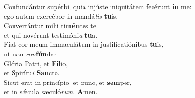 \evenverse Confundántur supérbi, quia injúste iniquitátem fecérunt \textbf{in} me:~\*\\
\evenverse ego autem exercébor in mandá\textit{tis} \textbf{tu}is.\\
\oddverse Convertántur mihi ti\textbf{mén}tes te:~\*\\
\oddverse et qui novérunt testimóni\textit{a} \textbf{tu}a.\\
\evenverse Fiat cor meum immaculátum in justificatiónibus \textbf{tu}is,~\*\\
\evenverse ut non \textit{con}\textbf{fún}dar.\\
\oddverse Glória Patri, et \textbf{Fí}lio,~\*\\
\oddverse et Spirítu\textit{i} \textbf{San}cto.\\
\evenverse Sicut erat in princípio, et nunc, et \textbf{sem}per,~\*\\
\evenverse et in sǽcula sæculó\textit{rum}. \textbf{A}men.\\
